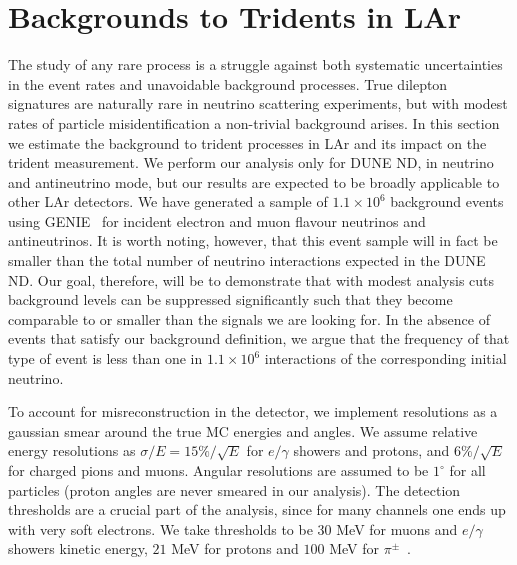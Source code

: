 %

\section{Backgrounds to Tridents in LAr}
\label{subsec:bck}

The study of any rare process is a struggle against both systematic uncertainties in the event rates and unavoidable background processes. True dilepton signatures are naturally rare in neutrino scattering experiments, but with modest rates of particle misidentification a non-trivial background arises. In this section we estimate the background to trident processes in LAr and its impact on the trident measurement. We perform our analysis only for DUNE ND, in neutrino and antineutrino mode, but our results are expected to be broadly applicable to other LAr detectors. We have generated a sample of $1.1 \times 10^6$ background events using GENIE~\cite{Andreopoulos2009} for incident electron and muon flavour neutrinos and antineutrinos. It is worth noting, however, that this event sample will in fact be smaller than the total number of neutrino interactions expected in the DUNE ND. 
%
Our goal, therefore, will be to demonstrate that with modest analysis cuts background levels can be suppressed significantly such that they become comparable to or smaller than the signals we are looking for. In the absence of events that satisfy our background definition, we argue that the frequency of that type of event is less than one in $1.1\times 10^6$ interactions of the corresponding initial neutrino.  

To account for misreconstruction in the detector, we implement resolutions as a gaussian smear around the true MC energies and angles. We assume relative energy resolutions as $\sigma/E = 15\%/\sqrt{E}$ for $e/\gamma$ showers and protons, and $6\%/\sqrt{E}$ for charged pions and muons. Angular resolutions are assumed to be $1^\circ$ for all particles (proton angles are never smeared in our analysis). The detection thresholds are a crucial part of the analysis, since for many channels one ends up with very soft electrons. We take thresholds to be $30$ MeV for muons and $e/\gamma$ showers kinetic energy, $21$ MeV for protons and $100$ MeV for $\pi^{\pm}$~\cite{DUNECDRvolII}.

